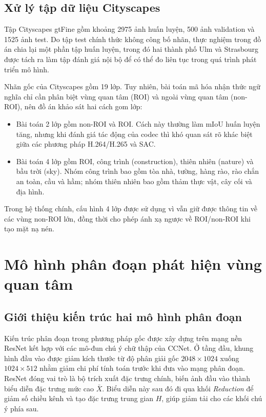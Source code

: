 \subsection{Xử lý tập dữ liệu Cityscapes}
Tập Cityscapes gtFine gồm khoảng 2975 ảnh huấn luyện, 500 ảnh validation và 1525 ảnh test. Do tập test chính thức không công bố nhãn, thực nghiệm trong đồ án chia lại một phần tập huấn luyện, trong đó hai thành phố Ulm và Strasbourg được tách ra làm tập đánh giá nội bộ để có thể đo liên tục trong quá trình phát triển mô hình.

Nhãn gốc của Cityscapes gồm 19 lớp. Tuy nhiên, bài toán mã hóa nhận thức ngữ nghĩa chỉ cần phân biệt vùng quan tâm (ROI) và ngoài vùng quan tâm (non-ROI), nên đồ án khảo sát hai cách gom lớp:
\begin{itemize}
    \item Bài toán 2 lớp gồm non-ROI và ROI. Cách này thường làm mIoU huấn luyện tăng, nhưng khi đánh giá tác động của codec thì khó quan sát rõ khác biệt giữa các phương pháp H.264/H.265 và SAC.
    \item Bài toán 4 lớp gồm ROI, công trình (construction), thiên nhiên (nature) và bầu trời (sky). Nhóm công trình bao gồm tòa nhà, tường, hàng rào, rào chắn an toàn, cầu và hầm; nhóm thiên nhiên bao gồm thảm thực vật, cây cối và địa hình.
\end{itemize}
Trong hệ thống chính, cấu hình 4 lớp được sử dụng vì vẫn giữ được thông tin về các vùng non-ROI lớn, đồng thời cho phép ánh xạ ngược về ROI/non-ROI khi tạo mặt nạ nén.


 
\section{Mô hình phân đoạn phát hiện vùng quan tâm}
\label{sec:mo-dun-roi}
 
\subsection{Giới thiệu kiến trúc hai mô hình phân đoạn}
\label{subsec:lua-chon-mo-hinh}
 
Kiến trúc phân đoạn trong phương pháp gốc được xây dựng trên mạng nền ResNet kết hợp với các mô-đun chú ý chữ thập của CCNet. Ở tầng đầu, khung hình đầu vào được giảm kích thước từ độ phân giải gốc $2048\times1024$ xuống $1024\times512$ nhằm giảm chi phí tính toán trước khi đưa vào mạng phân đoạn. ResNet đóng vai trò là bộ trích xuất đặc trưng chính, biến ảnh đầu vào thành biểu diễn đặc trưng mức cao $\bar{X}$. Biểu diễn này sau đó đi qua khối \textit{Reduction} để giảm số chiều kênh và tạo đặc trưng trung gian $H$, giúp giảm tải cho các khối chú ý phía sau.

